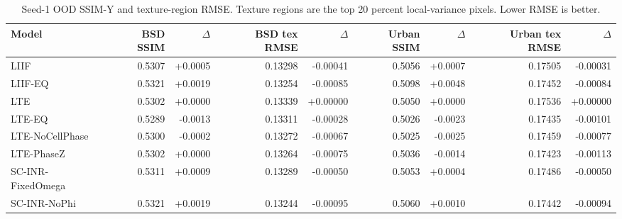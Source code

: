 \begin{table}[t]
\centering
\small
\caption{Seed-1 OOD SSIM-Y and texture-region RMSE. Texture regions are the top 20 percent local-variance pixels. Lower RMSE is better.}
\label{tab:seed1_aux_quality_texture}
\begin{tabular}{lrrrrrrrr}
\toprule
Model & BSD SSIM & $\Delta$ & BSD tex RMSE & $\Delta$ & Urban SSIM & $\Delta$ & Urban tex RMSE & $\Delta$ \\
\midrule
LIIF & 0.5307 & +0.0005 & 0.13298 & -0.00041 & 0.5056 & +0.0007 & 0.17505 & -0.00031 \\
LIIF-EQ & 0.5321 & +0.0019 & 0.13254 & -0.00085 & 0.5098 & +0.0048 & 0.17452 & -0.00084 \\
LTE & 0.5302 & +0.0000 & 0.13339 & +0.00000 & 0.5050 & +0.0000 & 0.17536 & +0.00000 \\
LTE-EQ & 0.5289 & -0.0013 & 0.13311 & -0.00028 & 0.5026 & -0.0023 & 0.17435 & -0.00101 \\
LTE-NoCellPhase & 0.5300 & -0.0002 & 0.13272 & -0.00067 & 0.5025 & -0.0025 & 0.17459 & -0.00077 \\
LTE-PhaseZ & 0.5302 & +0.0000 & 0.13264 & -0.00075 & 0.5036 & -0.0014 & 0.17423 & -0.00113 \\
SC-INR-FixedOmega & 0.5311 & +0.0009 & 0.13289 & -0.00050 & 0.5053 & +0.0004 & 0.17486 & -0.00050 \\
SC-INR-NoPhi & 0.5321 & +0.0019 & 0.13244 & -0.00095 & 0.5060 & +0.0010 & 0.17442 & -0.00094 \\
\bottomrule
\end{tabular}
\end{table}
